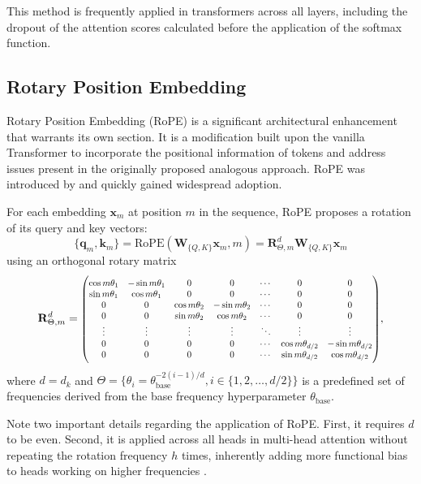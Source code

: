 This method is frequently applied in transformers across all layers, including the dropout of the attention scores calculated before the application of the softmax function.

\subsection{Rotary Position Embedding}\label{sec:rotary-position-embedding}


Rotary Position Embedding (RoPE) is a significant architectural enhancement that warrants its own section. It is a modification built upon the vanilla Transformer to incorporate the positional information of tokens and address issues present in the originally proposed analogous approach. RoPE was introduced by \citet{su2021} and quickly gained widespread adoption.

For each embedding \(\mathbf{x}_m\) at position \(m\) in the sequence, RoPE proposes a rotation of its query and key vectors:
\begin{equation}
	\{\mathbf{q}_m, \mathbf{k}_m\} = \mathrm{RoPE}(\mathbf{W}_{\{Q, K\}}\mathbf{x}_m, m) = \mathbf{R}^d_{\Theta, m}\mathbf{W}_{\{Q, K\}}\mathbf{x}_m 
\end{equation}
using an orthogonal rotary matrix  
\begin{equation}    
	\mathbf{R}^d_{\Theta,m} = 
	\scalebox{0.8}{\(
	\begin{pmatrix}
		\cos{m\theta_1}& -\sin{m\theta_1}&0&0&\cdots&0&0\\
		\sin{m\theta_1}&\cos{m\theta_1}&0&0&\cdots&0&0 \\
		0&0&\cos{m\theta_2}& -\sin{m\theta_2}&\cdots&0&0\\
		0&0&\sin{m\theta_2}&\cos{m\theta_2}&\cdots&0&0 \\
		\vdots&\vdots&\vdots&\vdots&\ddots&\vdots&\vdots\\
		0&0&0&0&\cdots&\cos{m\theta_{d/2}}& -\sin{m\theta_{d/2}}\\
		0&0&0&0&\cdots&\sin{m\theta_{d/2}}&\cos{m\theta_{d/2}}
	\end{pmatrix}
	\)},
\end{equation}
where \(d = d_k\) and \(\Theta = \{\theta_i=\theta_{\mathrm{base}}^{-2(i-1)/d}, i \in \{1, 2, \ldots, d/2\}\}\) is a predefined set of frequencies derived from the base frequency hyperparameter \(\theta_{\mathrm{base}}\).

Note two important details regarding the application of RoPE. First, it requires \(d\) to be even. Second, it is applied across all heads in multi-head attention without repeating the rotation frequency \(h\) times, inherently adding more functional bias to heads working on higher frequencies \parencite{barbero2024}.

